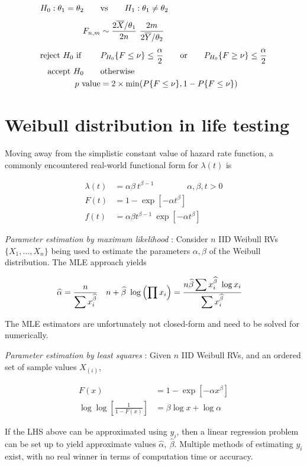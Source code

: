 \begin{align}
	H_0 : \theta_1 = \theta_2 \qquad &\text{vs} \qquad H_1 : \theta_1 \neq \theta_2 \\[1ex]
	F_{n,m} &\sim \frac{2\overline{X}/\theta_1}{2n}\ \frac{2m}{2\overline{Y}/\theta_2} \\[1ex]
	\text{reject $ H_0 $ if } \qquad & P_{H_0}\{F \leq \nu\} \leq \frac{\alpha}{2} \qquad \text{or} \qquad P_{H_0}\{F \geq \nu\} \leq \frac{\alpha}{2}  \nonumber \\
	\text{accept $ H_0 $} \qquad & \text{otherwise} \\
	p \text{ value} &= 2 \times \min(P\{F \leq \nu\}, 1 - P\{F \leq \nu\})
\end{align}

\section{Weibull distribution in life testing}

Moving away from the simplistic constant value of hazard rate function, a commonly encountered real-world functional form for \(\lambda(t)\) is

\begin{align}
	\lambda(t) &= \alpha \beta \ t^{\beta - 1} \qquad \qquad \alpha, \beta, t > 0 \\
	F(t) &= 1 - \exp \left[ -\alpha t^{\beta} \right] \\
	f(t) &= \alpha \beta t^{\beta - 1}\ \exp \left[ -\alpha t^\beta \right]
\end{align}

\textit{Parameter estimation by maximum likelihood} : Consider \(n\) IID Weibull RVs \(\{X_1, \dots, X_n\}\)  being used to estimate the parameters \(\alpha, \beta\) of the Weibull distribution. The MLE approach yields

\begin{align}
	\widehat{\alpha} &= \frac{\displaystyle n}{\displaystyle \sum x_i^{\widehat{\beta}}} & n + \widehat{\beta}\ \log\left( \prod x_i \right) &= \frac{\displaystyle n \widehat{\beta} \sum x_i^{\widehat{\beta}}\ \log x_i}{\displaystyle \sum x_i^{\widehat{\beta}}}
\end{align}

The MLE estimators are unfortunately not closed-form and need to be solved for numerically.

\textit{Parameter estimation by least squares} : Given \(n\) IID Weibull RVs, and an ordered set of sample values \(X_{(i)}\),

\begin{align}
	F(x) &= 1 - \exp \left[ -\alpha x^{\beta} \right] \\
	\log \log \left[ \frac{1}{1 - F(x)} \right] &= \beta \log x + \log \alpha
\end{align}

If the LHS above can be approximated using \(y_i\), then a linear regression problem can be set up to yield approximate values \(\widehat{\alpha},\ \widehat{\beta}\). Multiple methods of estimating \(y_i\) exist, with no real winner in terms of computation time or accuracy.